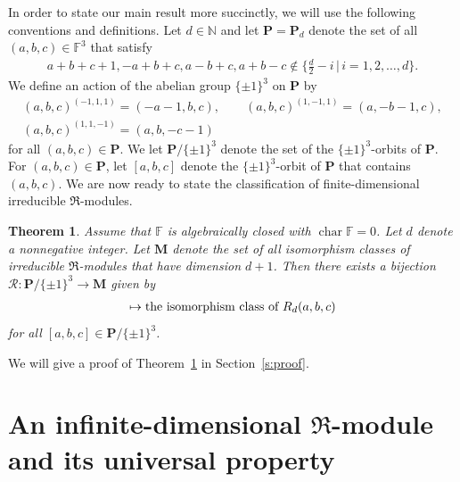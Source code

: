 \documentclass[pdftex]{sigma}
\def\N{\mathbb N}
\def\F{\mathbb F}
\numberwithin{equation}{section}
\newtheorem{Theorem}{Theorem}[section]
\begin{document}
In order to state our main result more succinctly, we will use the following conventions and definitions.
Let $d\in \N$ and let $\mathbf{P}=\mathbf{P}_d$ denote the set of all $(a,b,c)\in \F^3$ that satisfy
\begin{gather*}
a+b+c+1,-a+b+c,a-b+c,a+b-c\not\in \big\{\tfrac{d}{2}-i\,\big|\,i=1,2,\ldots,d\big\}.
\end{gather*}
We define an action of the abelian group $\{\pm 1\}^3$ on $\mathbf{P}$ by
\begin{gather*}
(a,b,c)^{(-1,1,1)} = (-a-1,b,c),\qquad
(a,b,c)^{(1,-1,1)} = (a,-b-1,c),\\
(a,b,c)^{(1,1,-1)} = (a,b,-c-1)
\end{gather*}
for all $(a,b,c)\in \mathbf{P}$. We let $\mathbf{P}/\{\pm 1\}^3$ denote the set of the $\{\pm 1\}^3$-orbits of $\mathbf{P}$. For $(a,b,c)\in \mathbf{P}$, let $[a,b,c]$ denote the $\{\pm 1\}^3$-orbit of $\mathbf{P}$ that contains $(a,b,c)$. We are now ready to state the classification of finite-dimensional irreducible $\Re$-modules.

\begin{Theorem}\label{thm:classification} Assume that $\F$ is algebraically closed with $\operatorname{char}\F=0$. Let $d$ denote a nonnegative integer. Let $\mathbf{M}$ denote the set of all isomorphism classes of irreducible $\Re$-modules that have dimension $d+1$. Then there exists a bijection $\mathcal R\colon \mathbf{P}/\{\pm 1\}^3 \to \mathbf{M}$ given by
\begin{gather*}
[a,b,c]\mapsto \hbox{the isomorphism class of $R_d(a,b,c)$}
\end{gather*}
for all $[a,b,c]\in \mathbf{P}/\{\pm 1\}^3$.
\end{Theorem}

We will give a proof of Theorem~\ref{thm:classification} in Section~\ref{s:proof}.

\section[An infinite-dimensional $\Re$-module and its universal property]{An infinite-dimensional $\boldsymbol{\Re}$-module and its universal property}\label{s:Verma}
\end{document}
